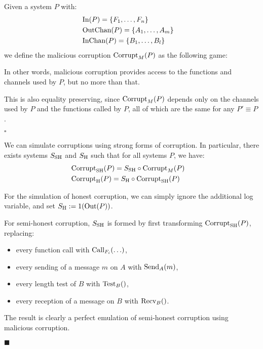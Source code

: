 \begin{definition}
Given a system $P$ with:
$$
\begin{aligned}
  &\text{In}(P) = \{F_1, \ldots, F_n\}\cr
  &\text{OutChan}(P) = \{A_1, \ldots, A_m\}\cr
  &\text{InChan}(P) = \{B_1, \ldots, B_l\}\cr
\end{aligned}
$$
we define the malicious corruption $\text{Corrupt}_M(P)$ as the following game:

In other words, malicious corruption provides access to the functions
and channels used by $P$, but no more than that.

This is also equality preserving, since $\text{Corrupt}_M(P)$ depends
only on the channels used by $P$ and the functions called by $P$,
all of which are the same for any $P' \equiv P$.

$\square$
\end{definition}

\begin{lemma}
  \label{thm:simulatingcorruption}
  We can simulate corruptions using strong forms of corruption.
  In particular, there exists systems $S_{\text{SH}}$ and $S_{\text{H}}$ such that
  for all systems $P$, we have:
  \[
    \begin{aligned}
      &\text{Corrupt}_{\text{SH}}(P) = S_{\text{SH}} \circ \text{Corrupt}_M(P)\cr
      &\text{Corrupt}_{\text{H}}(P) = S_{\text{H}} \circ \text{Corrupt}_{\text{SH}}(P)
    \end{aligned}
  \]

For the simulation of honest corruption, we can simply ignore
  the additional log variable, and set $S_{\text{H}} := 1(\text{Out}(P))$.

For semi-honest corruption, $S_{\text{SH}}$ is formed by first transforming
$\text{Corrupt}_{\text{SH}}(P)$, replacing:
\begin{itemize}
  \item every function call with $\text{Call}_{F_i}(\ldots)$,
  \item every sending of a message $m$ on $A$ with $\text{Send}_A(m)$,
  \item every length test of $B$ with $\text{Test}_B()$,
  \item every reception of a message on $B$ with $\text{Recv}_B()$.
\end{itemize}

The result is clearly a perfect emulation of semi-honest corruption
using malicious corruption.

$\blacksquare$
\end{lemma}

